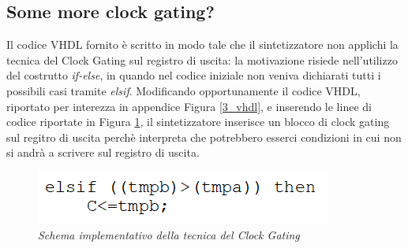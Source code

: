 \subsection{Some more clock gating?}
Il codice VHDL fornito è scritto in modo tale che il sintetizzatore non applichi la tecnica del Clock Gating sul registro di uscita: la motivazione risiede nell'utilizzo del costrutto \textit{if-else}, in quando nel codice iniziale non veniva dichiarati tutti i possibili casi tramite \textit{elsif}. Modificando opportunamente il codice VHDL,  riportato per interezza in appendice Figura \ref{3_vhdl}, e inserendo le linee di codice riportate in Figura \ref{3_vhdl_2}, il sintetizzatore inserisce un blocco di clock gating sul regitro di uscita perchè interpreta che potrebbero esserci condizioni in cui non si andrà a scrivere sul registro di uscita.
\begin{figure}[!htb]
	\centering
	\includegraphics[scale=1.5]{immagini/3_vhdl_2}
	\caption{\textit{Schema implementativo della tecnica del Clock Gating}}
	\label{3_vhdl_2}
\end{figure}

